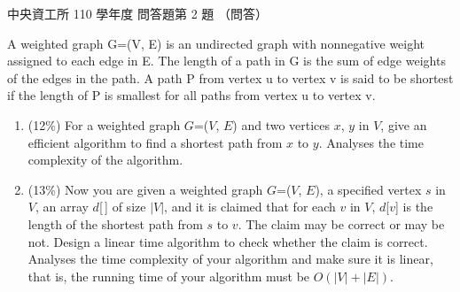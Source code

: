 \begin{pastexam}[label={px:ncu-110-dsa-12}]{中央資工所 110 學年度 問答題第 2 題}
（問答）

A weighted graph G=(V, E) is an undirected graph with nonnegative weight assigned to each edge in
E. The length of a path in G is the sum of edge weights of the edges in the path. A path P from
vertex u to vertex v is said to be shortest if the length of P is smallest for all paths from vertex
u to vertex v.
\begin{enumerate}[label=(\Alph*)]
\item (12\%) For a weighted graph $G$=($V$, $E$) and two vertices $x$, $y$ in $V$, give an efficient
algorithm to find a shortest path from $x$ to $y$. Analyses the time complexity of the algorithm.
\item (13\%) Now you are given a weighted graph $G$=($V$, $E$), a specified vertex $s$ in $V$, an
array $d$[\,] of size $|V|$, and it is claimed that for each $v$ in $V$, $d$[$v$] is the length of the
shortest path from $s$ to $v$. The claim may be correct or may be not. Design a linear time
algorithm to check whether the claim is correct. Analyses the time complexity of your algorithm and
make sure it is linear, that is, the running time of your algorithm must be $O(|V|+|E|)$.
\end{enumerate}
\end{pastexam}

